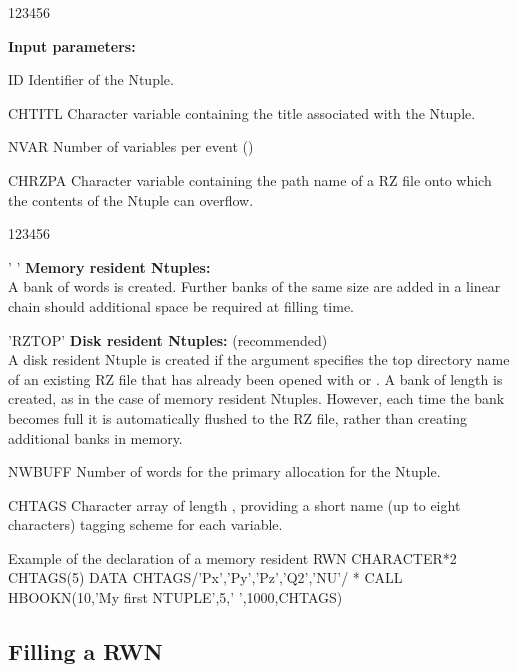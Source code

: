 \begin{DLtt}{123456}
\item[{\rm\bf Input parameters:}]
\item[ID] Identifier of the Ntuple.
\item[CHTITL] Character
    variable containing the title associated with the Ntuple.
\item[NVAR] Number of variables per event ()
\item[CHRZPA] Character variable containing the path
    name of a RZ file onto which the contents of the Ntuple
    can overflow.
    \begin{DLtt}{123456}
    \item[' '] {\bf Memory resident Ntuples:} \\
        A bank of  words is created.
        Further banks of the same size are added in a linear
        chain should additional space be required at filling time.
    \item['RZTOP'] {\bf Disk resident Ntuples:} (recommended) \\
        A disk resident Ntuple is created if the 
        argument specifies the top directory name of an existing RZ file
        that has already been opened with  or .
        A bank of length  is created, as in the case of 
        memory resident Ntuples. However, each time the bank becomes full
        it is automatically flushed to the RZ file, rather than
        creating additional banks in memory.
    \end{DLtt}
\item[NWBUFF]Number of words for the primary allocation for the Ntuple.
\item[CHTAGS] Character array of length , providing a short
    name (up to eight characters) tagging scheme for each variable.
\end{DLtt}
 
\begin{XMPt}{Example of the declaration of a memory resident RWN}
      CHARACTER*2 CHTAGS(5)
      DATA CHTAGS/'Px','Py','Pz','Q2','NU'/
 *
      CALL HBOOKN(10,'My first NTUPLE',5,' ',1000,CHTAGS)
\end{XMPt}
 
\subsection{Filling a RWN}
\label{HNTUFILL}

